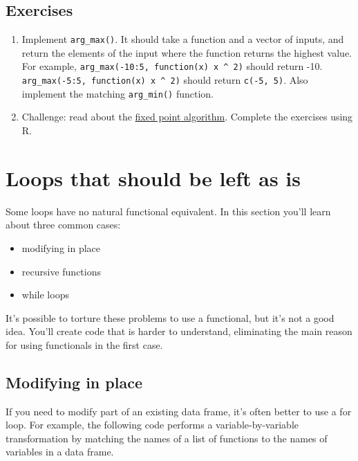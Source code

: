 \hypertarget{exercises-4}{%
\subsection{Exercises}\label{exercises-4}}

\begin{enumerate}
\def\labelenumi{\arabic{enumi}.}
\item
  Implement \texttt{arg\_max()}. It should take a function and a vector
  of inputs, and return the elements of the input where the function
  returns the highest value. For example,
  \texttt{arg\_max(-10:5,\ function(x)\ x\ \^{}\ 2)} should return -10.
  \texttt{arg\_max(-5:5,\ function(x)\ x\ \^{}\ 2)} should return
  \texttt{c(-5,\ 5)}. Also implement the matching \texttt{arg\_min()}
  function.
\item
  Challenge: read about the
  \href{http://mitpress.mit.edu/sicp/full-text/book/book-Z-H-12.html\#\%_sec_1.3}{fixed
  point algorithm}. Complete the exercises using R.
\end{enumerate}

\hypertarget{functionals-not}{%
\section{Loops that should be left as is}\label{functionals-not}}

Some loops have no natural functional equivalent. In this section you'll
learn about three common cases: 

\begin{itemize}
\tightlist
\item
  modifying in place
\item
  recursive functions
\item
  while loops
\end{itemize}

It's possible to torture these problems to use a functional, but it's
not a good idea. You'll create code that is harder to understand,
eliminating the main reason for using functionals in the first case.

\hypertarget{modifying-in-place}{%
\subsection{Modifying in place}\label{modifying-in-place}}

If you need to modify part of an existing data frame, it's often better
to use a for loop. For example, the following code performs a
variable-by-variable transformation by matching the names of a list of
functions to the names of variables in a data frame.


